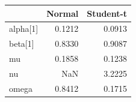 \begin{table}[htbp]
\centering
\begin{tabular}{lrr}
\toprule
 & Normal & Student-t \\
\midrule
alpha[1] & 0.1212 & 0.0913 \\
beta[1] & 0.8330 & 0.9087 \\
mu & 0.1858 & 0.1238 \\
nu & NaN & 3.2225 \\
omega & 0.8412 & 0.1715 \\
\bottomrule
\end{tabular}
\label{tab:garch}
\end{table}

